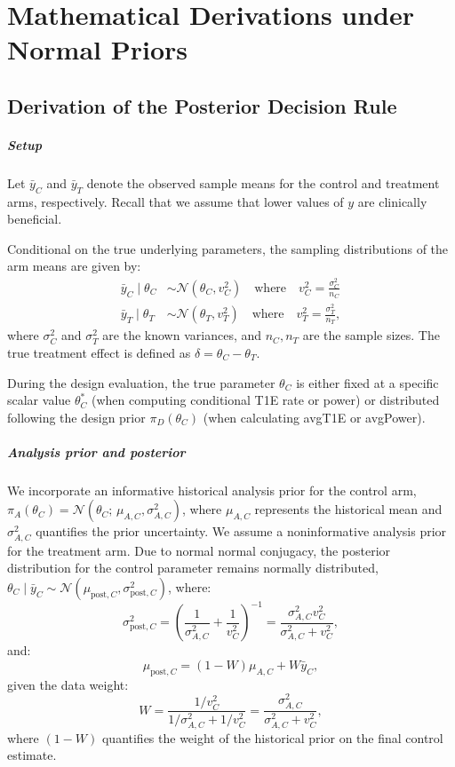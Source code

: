 \chapter{Mathematical Derivations under Normal Priors}
\label{sec:appendix_normal_priors}

\section{Derivation of the Posterior Decision Rule}

\paragraph{Setup}
Let $\bar{y}_C$ and $\bar{y}_T$ denote the observed sample means for the control and treatment arms, respectively. Recall that we assume that lower values of $y$ are clinically beneficial.  

Conditional on the true underlying parameters, the sampling distributions of the arm means are given by:
\begin{align*}
    \bar{y}_C \mid \theta_C &\sim \mathcal{N}(\theta_C, v_C^2) \quad \text{where} \quad v_C^2 = \frac{\sigma_C^2}{n_C}  \\
    \bar{y}_T \mid \theta_T &\sim \mathcal{N}(\theta_T, v_T^2) \quad \text{where} \quad v_T^2 = \frac{\sigma_T^2}{n_T}, 
\end{align*}
where $\sigma_C^2$ and $\sigma_T^2$ are the known variances, and $n_C, n_T$ are the sample sizes. The true treatment effect is defined as $\delta = \theta_C - \theta_T$. 

During the design evaluation, the true parameter $\theta_C$ is either fixed at a specific scalar value $\theta_C^*$ (when computing conditional T1E rate or power) or distributed following the design prior $\pi_D(\theta_C)$ (when calculating avgT1E or avgPower).


\paragraph{Analysis prior and posterior}
We incorporate an informative historical analysis prior for the control arm, $\pi_A(\theta_C) = \mathcal{N}(\theta_C;\, \mu_{A,C}, \sigma_{A,C}^2)$, where $\mu_{A,C}$ represents the historical mean and $\sigma_{A,C}^2$ quantifies the prior uncertainty. We assume a noninformative analysis prior for the treatment arm.
Due to normal normal conjugacy, the posterior distribution for the control parameter remains normally distributed, $\theta_C \mid \bar{y}_C \sim \mathcal{N}(\mu_{\text{post},C}, \sigma_{\text{post},C}^2)$, where:
$$
    \sigma_{\text{post},C}^2 = \left( \frac{1}{\sigma_{A,C}^2} + \frac{1}{v_C^2} \right)^{-1} = \frac{\sigma_{A,C}^2 v_C^2}{\sigma_{A,C}^2 + v_C^2},
$$
and: 
$$
    \mu_{\text{post},C} = (1 - W)\mu_{A,C} + W\bar{y}_C,
$$
given the data weight: 
$$
    W = \frac{1/v_C^2}{1/\sigma_{A,C}^2 + 1/v_C^2} = \frac{\sigma_{A,C}^2}{\sigma_{A,C}^2 + v_C^2},
$$
where $(1 - W)$ quantifies the weight of the historical prior on the final control estimate. 

